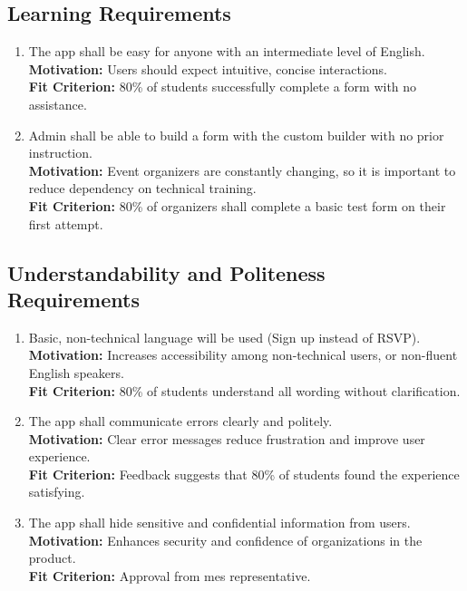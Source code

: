 \documentclass[12pt]{article}
\begin{document}
\subsection{Learning Requirements}
\begin{enumerate}[label=UHR-LR.\arabic*, wide=0pt, leftmargin=*]
  \item \label{UHLR1} The app shall be easy for anyone with an intermediate level of English.\\[2mm]
    {\bf Motivation:} Users should expect intuitive, concise interactions.\\
    {\bf Fit Criterion:} 80\% of students successfully complete a form with no assistance.
  \item \label{UHLR2} Admin shall be able to build a form with the custom builder with no prior instruction.\\[2mm]
    {\bf Motivation:} Event organizers are constantly changing, so it is important to reduce dependency on technical training.\\
    {\bf Fit Criterion:} 80\% of organizers shall complete a basic test form on their first attempt.
\end{enumerate}

\subsection{Understandability and Politeness Requirements}
\begin{enumerate}[label=UHR-UPR.\arabic*, wide=0pt, leftmargin=*]
  \item \label{UHUPR1} Basic, non-technical language will be used (Sign up instead of RSVP).\\[2mm]
    {\bf Motivation:} Increases accessibility among non-technical users, or non-fluent English speakers.\\
    {\bf Fit Criterion:} 80\% of students understand all wording without clarification.
  \item \label{UHUPR2} The app shall communicate errors clearly and politely.\\[2mm]
    {\bf Motivation:} Clear error messages reduce frustration and improve user experience.\\
    {\bf Fit Criterion:} Feedback suggests that 80\% of students found the experience satisfying.
  \item \label{UHUPR3} The app shall hide sensitive and confidential information from users.\\[2mm]
    {\bf Motivation:} Enhances security and confidence of organizations in the product.\\
    {\bf Fit Criterion:} Approval from \gls{mes} representative.
\end{enumerate}
\end{document}
